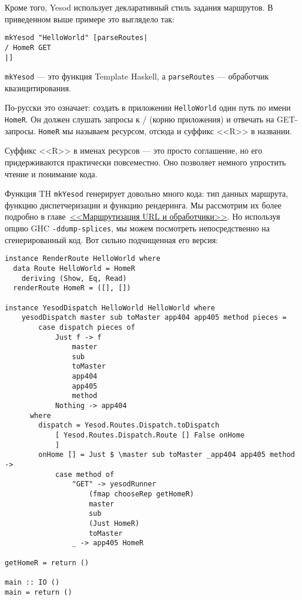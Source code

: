 Кроме того, Yesod использует декларативный стиль задания маршрутов. В приведенном выше
примере это выглядело так:

\begin{lstlisting}
mkYesod "HelloWorld" [parseRoutes|
/ HomeR GET
|]
\end{lstlisting}

\begin{remark}
  \lstinline!mkYesod! --- это функция Template Haskell, а \lstinline!parseRoutes! --- 
  обработчик квазицитирования.
\end{remark}

По-русски это означает: создать в приложении \texttt{HelloWorld} один путь по имени
\lstinline!HomeR!. Он должен слушать запросы к / (корню приложения) и отвечать на
GET-запросы. \lstinline!HomeR! мы называем ресурсом, отсюда и суффикс <<R>> в названии.

\begin{remark}
  Суффикс <<R>> в именах ресурсов --- это просто соглашение, но его придерживаются
  практически повсеместно. Оно позволяет немного упростить чтение и понимание кода.
\end{remark}

Функция TH \lstinline!mkYesod! генерирует довольно много кода: тип данных маршрута,
функцию диспетчеризации и функцию рендеринга. Мы рассмотрим их более подробно в
главе~\hyperref[ch:routing]{<<Маршрутизация URL и обработчики>>}. Но используя опцию GHC
\lstinline'-ddump-splices', мы можем посмотреть непосредственно на сгенерированный
код. Вот сильно подчищенная его версия:

\begin{lstlisting}
instance RenderRoute HelloWorld where
  data Route HelloWorld = HomeR
    deriving (Show, Eq, Read)
  renderRoute HomeR = ([], [])

instance YesodDispatch HelloWorld HelloWorld where
    yesodDispatch master sub toMaster app404 app405 method pieces =
        case dispatch pieces of
            Just f -> f
                master
                sub
                toMaster
                app404
                app405
                method
            Nothing -> app404
      where
        dispatch = Yesod.Routes.Dispatch.toDispatch
            [ Yesod.Routes.Dispatch.Route [] False onHome
            ]
        onHome [] = Just $ \master sub toMaster _app404 app405 method ->
            case method of
                "GET" -> yesodRunner
                    (fmap chooseRep getHomeR)
                    master
                    sub
                    (Just HomeR)
                    toMaster
                _ -> app405 HomeR

getHomeR = return ()

main :: IO ()
main = return ()
\end{lstlisting}

